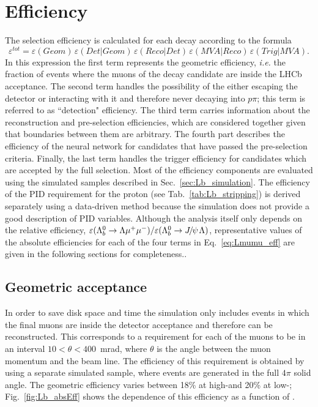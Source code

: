 \section{Efficiency}
\label{sec:Lb_eff}

The selection efficiency is calculated for each decay according to the formula
\begin{equation}
\label{eq:Lmumu_eff}
\varepsilon^{tot}=\varepsilon(Geom)\,\varepsilon(Det|Geom)\,\varepsilon(Reco|Det)\,\varepsilon(MVA|Reco)\,\varepsilon(Trig|MVA).
\end{equation}
In this expression the first term represents the geometric efficiency, \emph{i.e.} the fraction of events where
the muons of the decay candidate are inside the LHCb acceptance.
The second term handles the possibility of the \Lz either escaping the detector or interacting with it and therefore
never decaying into $p\pi$; this term is referred to as ``detection" efficiency.
The third term carries information about the reconstruction and pre-selection efficiencies,
which are considered together given that boundaries between them are arbitrary.
The fourth part describes the efficiency of the neural network for candidates that have passed the pre-selection criteria. 
Finally, the last term handles the trigger efficiency for candidates which are accepted by the full selection.
Most of the efficiency components are evaluated using the simulated samples described in Sec.~\ref{sec:Lb_simulation}.
The efficiency of the PID requirement for the proton (see Tab.~\ref{tab:Lb_stripping}) is derived separately 
using a data-driven method because the simulation does not provide a good description of PID variables. 
Although the analysis itself only depends on the relative efficiency,
$\varepsilon(\Lb\to\Lz\mumu)/\varepsilon(\Lb\to\jpsi\Lz)$, representative values of the absolute efficiencies 
for each of the four terms in Eq.~\ref{eq:Lmumu_eff} are given in the following sections for completeness.. 


\subsection{Geometric acceptance}
\label{sec:Lb_geomAcc}
In order to save disk space and time the simulation only includes events in which the final muons
are inside the detector acceptance and therefore can be reconstructed. This corresponds to a requirement for each
of the muons to be in an interval \mbox{$10 < \theta < 400$~mrad}, where $\theta$ is the angle between
the muon momentum and the beam line. The efficiency of this requirement is obtained by using 
a separate simulated sample, where events are generated in the full $4\pi$ solid angle.
The geometric efficiency varies between 18\% at high-\qsq and 20\% at low-\qsq;
Fig.~\ref{fig:Lb_absEff} shows the dependence of this efficiency as a function of \qsq.

